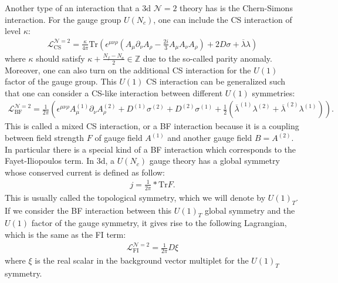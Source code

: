 \documentclass[a4paper,11pt]{article}
\begin{document}
Another type of an interaction that a 3d $\mathcal N = 2$ theory has is the Chern-Simons interaction. For the gauge group $U(N_c)$, one can include the CS interaction of level $\kappa$:
\begin{align}
\mathcal L_\text{CS}^{\mathcal N = 2} = \frac{\kappa}{4 \pi} \mathrm{Tr} \left(\epsilon^{\mu \nu \rho} \left( A_\mu \partial_\nu A_\rho- \frac{2 i}{3} A_\mu A_\nu A_\rho \right)+2 D \sigma+\overline \lambda \lambda\right)
\end{align}
where $\kappa$ should satisfy $\kappa+\frac{N_f-N_a}{2} \in \mathbb Z$ due to the so-called parity anomaly. Moreover, one can also turn on the additional CS interaction for the $U(1)$ factor of the gauge group. This $U(1)$ CS interaction can be generalized such that one can consider a CS-like interaction between different $U(1)$ symmetries:
\begin{align}
\mathcal L_\text{BF}^{\mathcal N = 2} = \frac{1}{2 \pi} \left(\epsilon^{\mu \nu \rho} A^{(1)}_\mu \partial_\nu A^{(2)}_\rho+D^{(1)} \sigma^{(2)}+D^{(2)} \sigma^{(1)}+\frac{1}{2} \left(\overline \lambda^{(1)} \lambda^{(2)}+\overline \lambda^{(2)} \lambda^{(1)}\right)\right).
\end{align}
This is called a mixed CS interaction, or a BF interaction because it is a coupling between field strength $F$ of gauge field $A^{(1)}$ and another gauge field $B = A^{(2)}$. In particular there is a special kind of a BF interaction which corresponds to the Fayet-Iliopoulos term. In 3d, a $U(N_c)$ gauge theory has a global symmetry whose conserved current is defined as follow:
\begin{align}
\label{eq:tcurrent}
j = \frac{1}{2 \pi} * \mathrm{Tr} F.
\end{align}
This is usually called the topological symmetry, which we will denote by $U(1)_T$. If we consider the BF interaction between this $U(1)_T$ global symmetry and the $U(1)$ factor of the gauge symmetry, it gives rise to the following Lagrangian, which is the same as the FI term:
\begin{align}
\mathcal L_\text{FI}^{\mathcal N = 2} = \frac{1}{2 \pi} D \xi
\end{align}
where $\xi$ is the real scalar in the background vector multiplet for the $U(1)_T$ symmetry.
\end{document}
